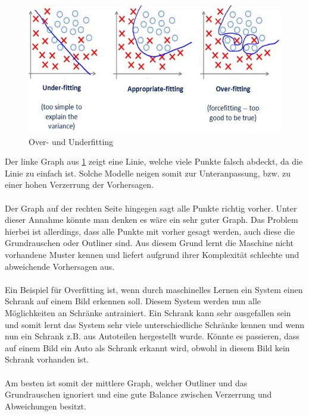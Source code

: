\documentclass[12pt,oneside,a4paper,parskip]{scrbook}
\begin{document}
\begin{figure}[h]
	\begin{center}
		\includegraphics[width=15cm]{Bilder/overUnderfitting.png}
		\caption{Over- und Underfitting}
		\label{fig:overUnderFitting}
	\end{center}
\end{figure}

Der linke Graph aus \ref{fig:overUnderFitting} zeigt eine Linie, welche viele Punkte falsch abdeckt, da die Linie zu einfach ist. Solche Modelle neigen somit zur Unteranpassung, bzw. zu einer hohen Verzerrung der Vorhersagen.
\\\\
Der Graph auf der rechten Seite hingegen sagt alle Punkte richtig vorher. Unter dieser Annahme könnte man denken es wäre ein sehr guter Graph. Das Problem hierbei ist allerdings, dass alle Punkte mit vorher gesagt werden, auch diese die Grundrauschen oder Outliner sind. Aus diesem Grund lernt die Maschine nicht vorhandene Muster kennen und liefert aufgrund ihrer Komplexität schlechte und abweichende Vorhersagen aus.\cite{overUnderfitting}
\\\\
Ein Beispiel für Overfitting ist, wenn durch maschinelles Lernen ein System einen Schrank auf einem Bild erkennen soll. Diesem System werden nun alle Möglichkeiten an Schränke antrainiert. Ein Schrank kann sehr ausgefallen sein und somit lernt das System sehr viele unterschiedliche Schränke kennen und wenn nun ein Schrank z.B. aus Autoteilen hergestellt wurde. Könnte es passieren, dass auf einem Bild ein Auto als Schrank erkannt wird, obwohl in diesem Bild kein Schrank vorhanden ist.
\\\\
Am besten ist somit der mittlere Graph, welcher Outliner und das Grundrauschen ignoriert und eine gute Balance zwischen Verzerrung und Abweichungen besitzt.
\end{document}
